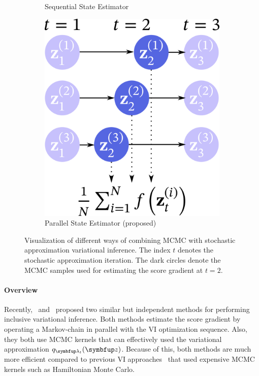 \begin{figure}
\begin{subfigure}[b]{0.35\textwidth}
        \caption{Sequential State Estimator}\label{fig:seq}
    \end{subfigure}
    \begin{subfigure}[b]{0.3\textwidth}
        \centering
        \includegraphics[scale=0.25]{figures/diagram_3.png}
        \caption{Parallel State Estimator (proposed)}\label{fig:par}
    \end{subfigure}
    \caption{Visualization of different ways of combining MCMC with stochastic approximation variational inference.
    The index \(t\) denotes the stochastic approximation iteration.
    The dark circles denote the MCMC samples used for estimating the score gradient at \(t=2\).
    }\label{fig:overview}
\end{figure}
%

%

\paragraph{Overview}
Recently,~\citet{NEURIPS2020_b2070693} and~\citet{pmlr-v124-ou20a} proposed two similar but independent methods for performing inclusive variational inference.
Both methods estimate the score gradient by operating a Markov-chain in parallel with the VI optimization sequence.
Also, they both use MCMC kernels that can effectively used the variational approximation \(q_{\vlambda_t}(\vz)\).
Because of this, both methods are much more efficient compared to previous VI approaches~\citep{pmlr-v97-ruiz19a, pmlr-v70-hoffman17a} that used expensive MCMC kernels such as Hamiltonian Monte Carlo.


